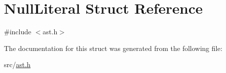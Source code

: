 \hypertarget{struct_null_literal}{}\section{Null\+Literal Struct Reference}
\label{struct_null_literal}


{\ttfamily \#include $<$ast.\+h$>$}



The documentation for this struct was generated from the following file\+:\begin{DoxyCompactItemize}
\item 
src/\hyperlink{ast_8h}{ast.\+h}\end{DoxyCompactItemize}
